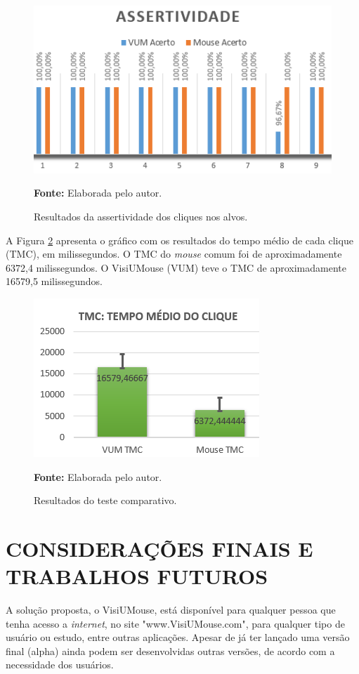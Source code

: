 \begin{figure}[htbp]
\caption{Resultados da assertividade dos cliques nos alvos.} 
\centering \includegraphics[scale=1]{img/assertividade.png}

{\fontsize{11}{11}\selectfont \textbf{Fonte:} Elaborada pelo autor.}
\label{fig:assertividade}
\end{figure}

A Figura \ref{fig:tmc} apresenta o gráfico com os resultados do tempo médio de cada clique (TMC), em milissegundos. O TMC do \textit{mouse} comum foi de aproximadamente 6372,4 milissegundos. O VisiUMouse (VUM) teve o TMC de aproximadamente 16579,5 milissegundos.
\begin{figure}[htbp]
\caption{Resultados do teste comparativo.} 
\centering \includegraphics[scale=1.5]{img/tmc2.png}

{\fontsize{11}{11}\selectfont \textbf{Fonte:} Elaborada pelo autor.}
\label{fig:tmc}
\end{figure}

\chapter{CONSIDERAÇÕES FINAIS E TRABALHOS FUTUROS}\label{CAP-consideracoes-finais-trabalhos-futuros}

A solução proposta, o VisiUMouse, está disponível para qualquer pessoa que tenha acesso a \textit{internet}, no site "www.VisiUMouse.com", para qualquer tipo de usuário ou estudo, entre outras aplicações. Apesar de já ter lançado uma versão final (alpha) ainda podem ser desenvolvidas outras versões, de acordo com a necessidade dos usuários.

